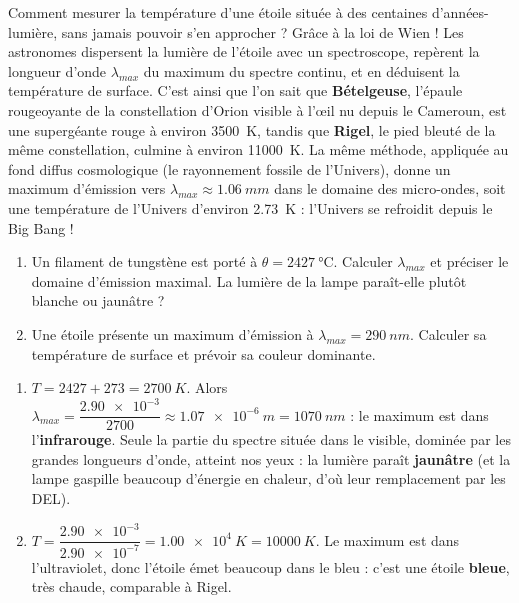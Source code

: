 \documentclass[11pt]{article}
\begin{document}
\begin{savaistu}
Comment mesurer la température d'une étoile située à des centaines d'années-lumière, sans jamais pouvoir s'en approcher ? Grâce à la loi de Wien ! Les astronomes dispersent la lumière de l'étoile avec un spectroscope, repèrent la longueur d'onde $\lambda_{max}$ du maximum du spectre continu, et en déduisent la température de surface. C'est ainsi que l'on sait que \textbf{Bételgeuse}, l'épaule rougeoyante de la constellation d'Orion visible à l'œil nu depuis le Cameroun, est une supergéante rouge à environ \SI{3500}{K}, tandis que \textbf{Rigel}, le pied bleuté de la même constellation, culmine à environ \SI{11000}{K}. La même méthode, appliquée au fond diffus cosmologique (le rayonnement fossile de l'Univers), donne un maximum d'émission vers $\lambda_{max} \approx \SI{1,06}{mm}$ dans le domaine des micro-ondes, soit une température de l'Univers d'environ \SI{2,73}{K} : l'Univers se refroidit depuis le Big Bang !
\end{savaistu}

\begin{exercice}
\begin{enumerate}
\item Un filament de tungstène est porté à $\theta = \SI{2427}{\celsius}$. Calculer $\lambda_{max}$ et préciser le domaine d'émission maximal. La lumière de la lampe paraît-elle plutôt blanche ou jaunâtre ?
\item Une étoile présente un maximum d'émission à $\lambda_{max} = \SI{290}{nm}$. Calculer sa température de surface et prévoir sa couleur dominante.
\end{enumerate}
\end{exercice}

\begin{corrige}[Exercice]
\begin{enumerate}
\item $T = 2427 + 273 = \SI{2700}{K}$. Alors $\lambda_{max} = \dfrac{\num{2,90e-3}}{2700} \approx \num{1,07e-6}\ \si{m} = \SI{1070}{nm}$ : le maximum est dans l'\textbf{infrarouge}. Seule la partie du spectre située dans le visible, dominée par les grandes longueurs d'onde, atteint nos yeux : la lumière paraît \textbf{jaunâtre} (et la lampe gaspille beaucoup d'énergie en chaleur, d'où leur remplacement par les DEL).
\item $T = \dfrac{\num{2,90e-3}}{\num{2,90e-7}} = \num{1,00e4}\ \si{K} = \SI{10000}{K}$. Le maximum est dans l'ultraviolet, donc l'étoile émet beaucoup dans le bleu : c'est une étoile \textbf{bleue}, très chaude, comparable à Rigel.
\end{enumerate}
\end{corrige}
\end{document}
